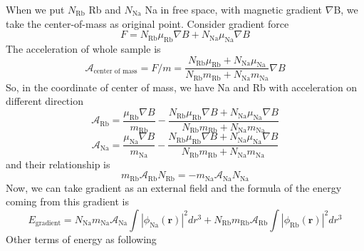 When we put $N_{\text{Rb}}$ Rb and $N_{\text{Na}}$ Na in free space, with magnetic gradient $\nabla $B, we take the center-of-mass as original point.
Consider gradient force
\begin{equation}
F=N_{\text{Rb}}\mu _{\text{Rb}}\nabla B+N_{\text{Na}}\mu _{\text{Na}}\nabla B
\end{equation}
The acceleration of whole sample is
\begin{equation}
\mathcal{A}_{\text{center of mass}}=F/m=\frac{N_{\text{Rb}}\mu _{\text{Rb}}+N_{\text{Na}}\mu _{\text{Na}}}{N_{\text{Rb}}m_{\text{Rb}}+N_{\text{Na}}m_{\text{Na}}}\nabla B
\end{equation}
So, in the coordinate of center of mass, we have Na and Rb with acceleration on different direction
\begin{equation}
\mathcal{A}_{\text{Rb}}=\frac{\mu _{\text{Rb}}\nabla B}{m_{\text{Rb}}}-\frac{N_{\text{Rb}}\mu _{\text{Rb}}\nabla B+N_{\text{Na}}\mu _{\text{Na}}\nabla
B}{N_{\text{Rb}}m_{\text{Rb}}+N_{\text{Na}}m_{\text{Na}}}
\end{equation}
\begin{equation}
\mathcal{A}_{\text{Na}}=\frac{\mu _{\text{Na}}\nabla B}{m_{\text{Na}}}-\frac{N_{\text{Rb}}\mu _{\text{Rb}}\nabla B+N_{\text{Na}}\mu _{\text{Na}}\nabla
B}{N_{\text{Rb}}m_{\text{Rb}}+N_{\text{Na}}m_{\text{Na}}}
\end{equation}
and their relationship is
\begin{equation}
m_{\text{Rb}}\mathcal{A}_{\text{Rb}}N_{\text{Rb}}=-m_{\text{Na}}\mathcal{A}_{\text{Na}}N_{\text{Na}}
\end{equation}
Now, we can take gradient as an external field and the formula of the energy coming from this gradient is
\begin{equation}
E_{\text{gradient}}=N_{\text{Na}}m_{\text{Na}}\mathcal{A}_{\text{Na}}\int \left| \phi _{\text{Na}}(\pmb{r})\right|^2dr^3+N_{\text{Rb}}m_{\text{Rb}}\mathcal{A}_{\text{Rb}}\int\left|\phi _{\text{Rb}}(\pmb{r})\right|^2dr^3
\end{equation}
Other terms of energy as following
